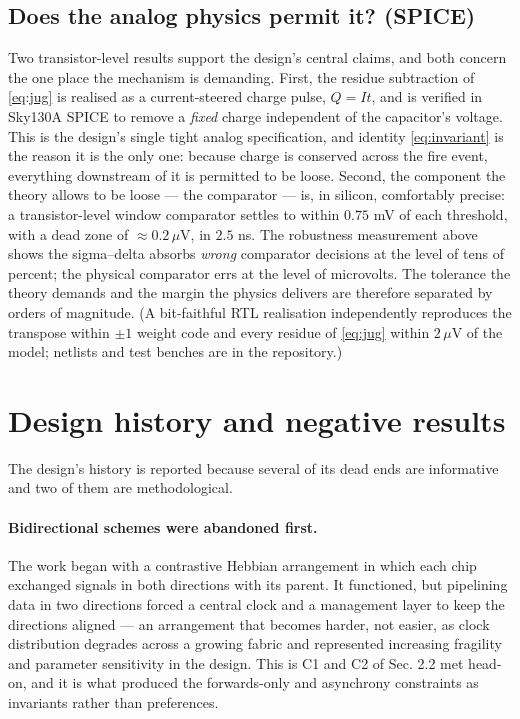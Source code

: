 \documentclass[11pt]{article}
\begin{document}
\hypertarget{does-the-analog-physics-permit-it-spice}{%
\subsection{Does the analog physics permit it?
(SPICE)}\label{does-the-analog-physics-permit-it-spice}}

Two transistor-level results support the design's central claims, and
both concern the one place the mechanism is demanding. First, the
residue subtraction of \eqref{eq:jug} is realised as a current-steered charge
pulse, \(Q = It\), and is verified in Sky130A SPICE to remove a
\emph{fixed} charge independent of the capacitor's voltage. This is the
design's single tight analog specification, and identity \eqref{eq:invariant} is the
reason it is the only one: because charge is conserved across the fire
event, everything downstream of it is permitted to be loose. Second, the
component the theory allows to be loose --- the comparator --- is, in
silicon, comfortably precise: a transistor-level window comparator
settles to within \(0.75\) mV of each threshold, with a dead zone of
\(\approx 0.2\,\mu\)V, in \(2.5\) ns. The robustness measurement above
shows the sigma--delta absorbs \emph{wrong} comparator decisions at the
level of tens of percent; the physical comparator errs at the level of
microvolts. The tolerance the theory demands and the margin the physics
delivers are therefore separated by orders of magnitude. (A bit-faithful
RTL realisation independently reproduces the transpose within \(\pm1\)
weight code and every residue of \eqref{eq:jug} within \(2\,\mu\)V of the model;
netlists and test benches are in the repository.)

\hypertarget{sec:history}{%
\section{Design history and negative results}\label{sec:history}}

The design's history is reported because several of its dead ends are
informative and two of them are methodological.

\hypertarget{bidirectional-schemes-were-abandoned-first.}{%
\paragraph{Bidirectional schemes were abandoned
first.}\label{bidirectional-schemes-were-abandoned-first.}}

The work began with a contrastive Hebbian arrangement in which each chip
exchanged signals in both directions with its parent. It functioned, but
pipelining data in two directions forced a central clock and a
management layer to keep the directions aligned --- an arrangement that
becomes harder, not easier, as clock distribution degrades across a
growing fabric and represented increasing fragility and parameter
sensitivity in the design. This is C1 and C2 of Sec. 2.2 met head-on,
and it is what produced the forwards-only and asynchrony constraints as
invariants rather than preferences.
\end{document}

